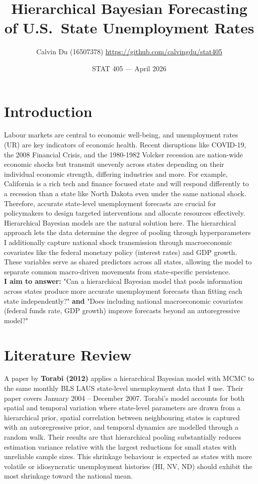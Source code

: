 \documentclass[10pt]{article}
\title{\textbf{Hierarchical Bayesian Forecasting of U.S.\ State Unemployment Rates}}
\author{Calvin Du (16507378) \quad \url{https://github.com/calvingdu/stat405}}
\date{STAT 405 --- April 2026}
\begin{document}
\maketitle\vspace{-10pt}

\section{Introduction}
Labour markets are central to economic well-being, and unemployment rates (UR) are key indicators of economic health.
Recent disruptions like COVID-19, the 2008 Financial Crisis, and the 1980-1982 Volcker recession are nation-wide
economic shocks but transmit unevenly across states depending on their individual economic strength, differing industries and more.
For example, California is a rich tech and finance focused state and will respond differently to a recession than a state like North Dakota even under
the same national shock. Therefore, accurate state-level unemployment forecasts are crucial for policymakers to design targeted interventions and allocate resources effectively. \\ 

Hierarchical Bayesian models are the natural solution here. 
The hierarchical approach lets the data determine the degree of pooling
through hyperparameters I additionally capture 
national shock transmission through macroeconomic
covariates like the federal monetary policy (interest rates) and GDP growth. These variables
serve as shared predictors across all states, allowing the model to separate common
macro-driven movements from state-specific persistence. \\ 

\textbf{I aim to answer:} "Can a hierarchical Bayesian model 
that pools information across states produce more accurate unemployment forecasts than fitting each state independently?"
\textbf{and} "Does including national macroeconomic covariates
(federal funds rate, GDP growth) improve forecasts beyond an autoregressive model?"
\section{Literature Review}
A paper by \textbf{Torabi (2012)} applies a hierarchical
Bayesian model with MCMC to the same monthly BLS LAUS
state-level unemployment data that I use. Their paper covers January 2004 -- December 2007.
Torabi's model accounts for both spatial and temporal variation where state-level
parameters are drawn from a hierarchical prior, spatial correlation between
neighbouring states is captured with an autoregressive
prior, and temporal dynamics are modelled through a random walk. 
Their results are that hierarchical pooling substantially reduces estimation
variance relative with the largest reductions for
small states with unreliable sample sizes. This shrinkage behaviour is expected as states with more volatile or idiosyncratic
unemployment histories (HI, NV, ND) should exhibit the most shrinkage
toward the national mean.
\end{document}
